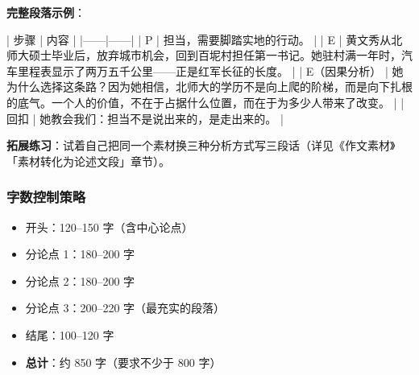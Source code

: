\textbf{完整段落示例}：

| 步骤 | 内容 |
|------|------|
| P | 担当，需要脚踏实地的行动。 |
| E | 黄文秀从北师大硕士毕业后，放弃城市机会，回到百坭村担任第一书记。她驻村满一年时，汽车里程表显示了两万五千公里——正是红军长征的长度。 |
| E（因果分析） | 她为什么选择这条路？因为她相信，北师大的学历不是向上爬的阶梯，而是向下扎根的底气。一个人的价值，不在于占据什么位置，而在于为多少人带来了改变。 |
| 回扣 | 她教会我们：担当不是说出来的，是走出来的。 |

\textbf{拓展练习}：试着自己把同一个素材换三种分析方式写三段话（详见《作文素材》「素材转化为论述文段」章节）。

\subsubsection{字数控制策略}

\begin{itemize}
  \item 开头：120--150 字（含中心论点）
  \item 分论点 1：180--200 字
  \item 分论点 2：180--200 字
  \item 分论点 3：200--220 字（最充实的段落）
  \item 结尾：100--120 字
  \item \textbf{总计}：约 850 字（要求不少于 800 字）
\end{itemize}
